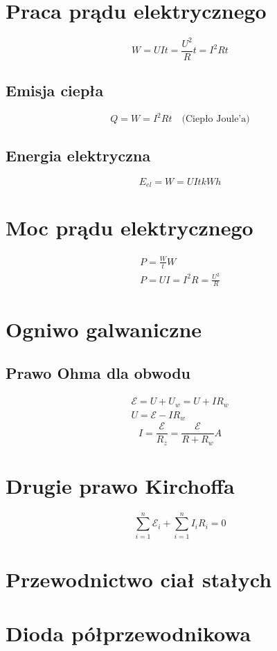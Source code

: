     \section{Praca prądu elektrycznego}
      \begin{equation}
        W = UIt = \frac{U^2}{R}t = I^2Rt
      \end{equation}
      \subsection{Emisja ciepła}
        \begin{equation}
          Q = W = I^2Rt \quad\text{(Ciepło Joule'a)}
        \end{equation}
      \subsection{Energia elektryczna}
        \begin{equation}
          E_{el} = W = UIt \unit{kWh}
        \end{equation}
    \section{Moc prądu elektrycznego}
      \begin{gather}
        P = \frac{W}{t} \unit{W}\\
        P = UI = I^2R = \frac{U^2}{R}
      \end{gather}
    \section{Ogniwo galwaniczne}
      \subsection{Prawo Ohma dla obwodu}
        \begin{gather}
          \mathcal E = U + U_w = U + IR_w\\
          U = \mathcal E - IR_w
        \end{gather}
        \begin{equation}
          I = \frac{\mathcal E}{R_z} = \frac{\mathcal E}{R + R_w} \unit{A}
        \end{equation}
    \section{Drugie prawo Kirchoffa}
      \begin{equation}
        \sum_{i=1}^n \mathcal E_i + \sum_{i=1}^n I_iR_i = 0
      \end{equation}
    \section{Przewodnictwo ciał stałych}
    \section{Dioda półprzewodnikowa}
